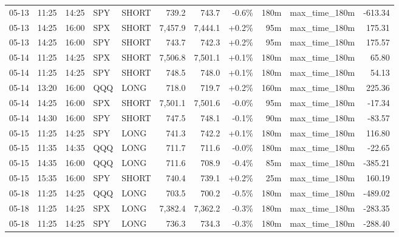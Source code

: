 \documentclass[11pt,a4paper,twoside]{article}
\begin{document}
\begin{center}
\begin{longtable}{>{\color{txtmain}}l l l l l r r r r >{\color{txtmain}}l r}
05-13 & 11:25 & 14:25 & SPY & SHORT & 739.2 & 743.7 & \textcolor{lossred}{-0.6\%} & 180m & max\_time\_180m & \textcolor{lossred}{-613.34} \\
05-13 & 14:25 & 16:00 & SPX & SHORT & 7,457.9 & 7,444.1 & \textcolor{wingreen}{+0.2\%} & 95m & max\_time\_180m & \textcolor{wingreen}{175.31} \\
05-13 & 14:25 & 16:00 & SPY & SHORT & 743.7 & 742.3 & \textcolor{wingreen}{+0.2\%} & 95m & max\_time\_180m & \textcolor{wingreen}{175.57} \\
05-14 & 11:25 & 14:25 & SPX & SHORT & 7,506.8 & 7,501.1 & \textcolor{wingreen}{+0.1\%} & 180m & max\_time\_180m & \textcolor{wingreen}{65.80} \\
05-14 & 11:25 & 14:25 & SPY & SHORT & 748.5 & 748.0 & \textcolor{wingreen}{+0.1\%} & 180m & max\_time\_180m & \textcolor{wingreen}{54.13} \\
05-14 & 13:20 & 16:00 & QQQ & LONG & 718.0 & 719.7 & \textcolor{wingreen}{+0.2\%} & 160m & max\_time\_180m & \textcolor{wingreen}{225.36} \\
05-14 & 14:25 & 16:00 & SPX & SHORT & 7,501.1 & 7,501.6 & \textcolor{lossred}{-0.0\%} & 95m & max\_time\_180m & \textcolor{lossred}{-17.34} \\
05-14 & 14:30 & 16:00 & SPY & SHORT & 747.5 & 748.1 & \textcolor{lossred}{-0.1\%} & 90m & max\_time\_180m & \textcolor{lossred}{-83.57} \\
05-15 & 11:25 & 14:25 & SPY & LONG & 741.3 & 742.2 & \textcolor{wingreen}{+0.1\%} & 180m & max\_time\_180m & \textcolor{wingreen}{116.80} \\
05-15 & 11:35 & 14:35 & QQQ & LONG & 711.7 & 711.6 & \textcolor{lossred}{-0.0\%} & 180m & max\_time\_180m & \textcolor{lossred}{-22.65} \\
05-15 & 14:35 & 16:00 & QQQ & LONG & 711.6 & 708.9 & \textcolor{lossred}{-0.4\%} & 85m & max\_time\_180m & \textcolor{lossred}{-385.21} \\
05-15 & 15:35 & 16:00 & SPY & SHORT & 740.4 & 739.1 & \textcolor{wingreen}{+0.2\%} & 25m & max\_time\_180m & \textcolor{wingreen}{160.19} \\
05-18 & 11:25 & 14:25 & QQQ & LONG & 703.5 & 700.2 & \textcolor{lossred}{-0.5\%} & 180m & max\_time\_180m & \textcolor{lossred}{-489.02} \\
05-18 & 11:25 & 14:25 & SPX & LONG & 7,382.4 & 7,362.2 & \textcolor{lossred}{-0.3\%} & 180m & max\_time\_180m & \textcolor{lossred}{-283.35} \\
05-18 & 11:25 & 14:25 & SPY & LONG & 736.3 & 734.3 & \textcolor{lossred}{-0.3\%} & 180m & max\_time\_180m & \textcolor{lossred}{-288.40} \\

\end{longtable}
\end{center}
\end{document}
